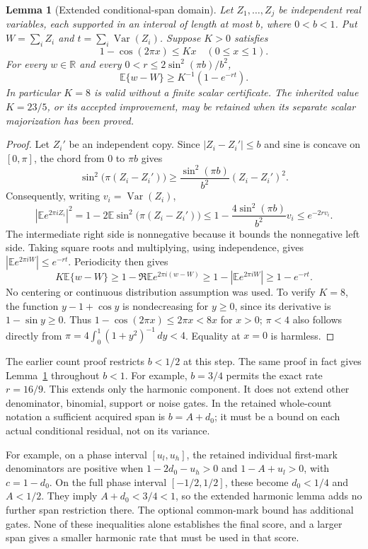 \documentclass[11pt]{article}
\newcommand{\E}{\mathbb E}
\newcommand{\R}{\mathbb R}
\newtheorem{lemma}{Lemma}
\begin{document}
\begin{lemma}[Extended conditional-span domain]\label{ex:harmonic}
Let $Z_1,\ldots,Z_j$ be independent real variables, each supported in an
interval of length at most $b$, where $0<b<1$.
Put $W=\sum_i Z_i$ and $t=\sum_i\operatorname{Var}(Z_i)$.
Suppose $K>0$ satisfies
\[
                  1-\cos(2\pi x)\le Kx\quad(0\le x\le1).
\]
For every $w\in\R$ and every
$0<r\le2\sin^2(\pi b)/b^2$,
\begin{equation}\label{ex:gain}
                     \E\{w-W\}\ge K^{-1}(1-e^{-rt}).
\end{equation}
In particular $K=8$ is valid without a finite scalar certificate.
The inherited value $K=23/5$, or its accepted improvement, may be retained
when its separate scalar majorization has been proved.
\end{lemma}
\begin{proof}
Let $Z_i'$ be an independent copy. Since $|Z_i-Z_i'|\le b$ and sine is
concave on $[0,\pi]$, the chord from $0$ to $\pi b$ gives
\[
 \sin^2\bigl(\pi(Z_i-Z_i')\bigr)
 \ge\frac{\sin^2(\pi b)}{b^2}(Z_i-Z_i')^2.
\]
Consequently, writing $v_i=\operatorname{Var}(Z_i)$,
\[
 |\E e^{2\pi iZ_i}|^2
 =1-2\E\sin^2\bigl(\pi(Z_i-Z_i')\bigr)
 \le1-\frac{4\sin^2(\pi b)}{b^2}v_i
 \le e^{-2rv_i}.
\]
The intermediate right side is nonnegative because it bounds the
nonnegative left side. Taking square roots and multiplying, using
independence, gives $|\E e^{2\pi iW}|\le e^{-rt}$. Periodicity then gives
\[
 K\E\{w-W\}\ge1-\Re\E e^{2\pi i(w-W)}
                \ge1-|\E e^{2\pi iW}|\ge1-e^{-rt}.
\]
No centering or continuous distribution assumption was used. To verify
$K=8$, the function $y-1+\cos y$ is nondecreasing for $y\ge0$, since its
derivative is $1-\sin y\ge0$. Thus $1-\cos(2\pi x)\le2\pi x<8x$ for
$x>0$; $\pi<4$ also follows directly from
$\pi=4\int_0^1(1+y^2)^{-1}\,dy<4$. Equality at $x=0$ is harmless.
\end{proof}

The earlier count proof restricts $b<1/2$ at this step. The same proof in
fact gives Lemma~\ref{ex:harmonic} throughout $b<1$. For example,
$b=3/4$ permits the exact rate $r=16/9$.
This extends only the harmonic component. It does not extend other
denominator, binomial, support or noise gates. In the retained whole-count
notation a sufficient acquired span is $b=A+d_0$; it must be a bound on
each actual conditional residual, not on its variance.

For example, on a phase interval $[u_l,u_h]$, the retained individual
first-mark denominators are positive when
$1-2d_0-u_h>0$ and $1-A+u_l>0$, with $c=1-d_0$.
On the full phase interval $[-1/2,1/2]$, these become $d_0<1/4$
and $A<1/2$. They imply $A+d_0<3/4<1$, so the extended harmonic
lemma adds no further span restriction there. The optional common-mark
bound has additional gates. None of these inequalities alone establishes
the final score, and a larger span gives a smaller harmonic rate that must
be used in that score.
\end{document}
